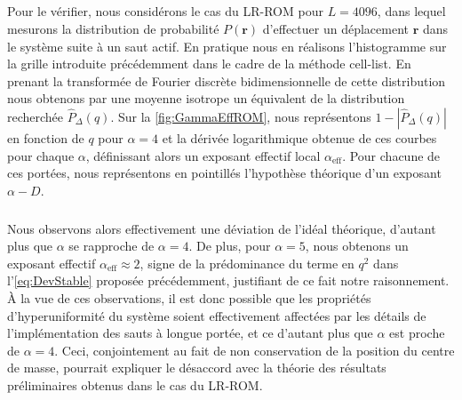 \subparagraph{}Pour le vérifier, nous considérons le cas du LR-ROM pour $L=4096$, dans lequel mesurons la distribution de probabilité $P(\mathbf{r})$ d'effectuer un déplacement $\mathbf{r}$ dans le système suite à un saut actif. En pratique nous en réalisons l'histogramme sur la grille introduite précédemment dans le cadre de la méthode cell-list. En prenant la transformée de Fourier discrète bidimensionnelle de cette distribution nous obtenons par une moyenne isotrope un équivalent de la distribution recherchée $\hat{P}_\Delta (q)$. Sur la \autoref{fig:GammaEffROM}, nous représentons $1-|\hat{P}_\Delta (q)|$ en fonction de $q$ pour $\alpha=4$ et la dérivée logarithmique obtenue de ces courbes pour chaque $\alpha$, définissant alors un exposant effectif local $\alpha_\text{eff}$. Pour chacune de ces portées, nous représentons en pointillés l'hypothèse théorique d'un exposant $\alpha-D$.

\subparagraph{}Nous observons alors effectivement une déviation de l'idéal théorique, d'autant plus que $\alpha$ se rapproche de $\alpha = 4$. De plus, pour $\alpha=5$, nous obtenons un exposant effectif $\alpha_\text{eff}\approx2$, signe de la prédominance du terme en $q^2$ dans l'\autoref{eq:DevStable} proposée précédemment, justifiant de ce fait notre raisonnement.
\`A la vue de ces observations, il est donc possible que les propriétés d'hyperuniformité du système soient effectivement affectées par les détails de l'implémentation des sauts à longue portée, et ce d'autant plus que $\alpha$ est proche de $\alpha=4$. Ceci, conjointement au fait de non conservation de la position du centre de masse, pourrait expliquer le désaccord avec la théorie des résultats préliminaires obtenus dans le cas du LR-ROM.

%

